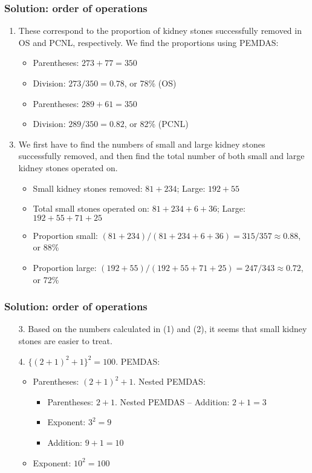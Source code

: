 \documentclass[11pt,dvipsnames]{beamer}
\newcommand{\myframe}[1]{\begin{frame} \frametitle{#1}}
\begin{document}
\myframe{Solution: order of operations}
\begin{enumerate}
\item These correspond to the proportion of kidney stones successfully removed in OS and PCNL, respectively. We find the proportions using PEMDAS: \pause
\begin{itemize}
\item Parentheses: $273+77 = 350$ \pause
\item Division: $273/350 = 0.78$, or 78\% (OS)
\item Parentheses: $289+61 = 350$ \pause
\item Division: $289/350 = 0.82$, or 82\% (PCNL)
\end{itemize}
\item[] \pause
\item We first have to find the numbers of small and large kidney stones successfully removed, and then find the total number of both small and large kidney stones operated on. \pause
\begin{itemize}
\item Small kidney stones removed: $81+234$; Large: $192+55$ \pause
\item Total small stones operated on: $81+234+6+36$; Large: $192+55+71+25$ \pause
\item Proportion small: $(81+234)/(81+234+6+36) = 315/357 \approx 0.88$, or 88\% \pause
\item Proportion large: $(192+55)/(192+55+71+25) = 247/343 \approx 0.72$, or 72\% \pause
\end{itemize}
\end{enumerate}
\end{frame}

\myframe{Solution: order of operations}
\begin{enumerate}
\item[3.] Based on the numbers calculated in (1) and (2), it seems that small kidney stones are easier to treat. \pause
\item[]
\item[4.] $\{(2+1)^2 + 1\}^2 = 100$. PEMDAS: \pause
\begin{itemize}
\item Parentheses: $(2 + 1)^2 + 1$. Nested PEMDAS:
\begin{itemize}
\item Parentheses: $2 + 1$. Nested PEMDAS -- Addition: $2 + 1 = 3$
\item Exponent: $3^2 = 9$ 
\item Addition: $9 + 1 = 10$
\end{itemize} \pause
\item Exponent: $10^2 = 100$
\end{itemize}
\end{enumerate}
\end{frame}
\end{document}
